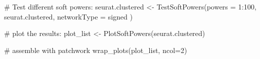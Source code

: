 \documentclass[
  letterpaper,
  DIV=11,
  numbers=noendperiod]{scrartcl}
\newenvironment{Shaded}{\begin{snugshade}}{\end{snugshade}}
\newcommand{\AttributeTok}[1]{\textcolor[rgb]{0.40,0.45,0.13}{#1}}
\newcommand{\CommentTok}[1]{\textcolor[rgb]{0.37,0.37,0.37}{#1}}
\newcommand{\DecValTok}[1]{\textcolor[rgb]{0.68,0.00,0.00}{#1}}
\newcommand{\FunctionTok}[1]{\textcolor[rgb]{0.28,0.35,0.67}{#1}}
\newcommand{\NormalTok}[1]{\textcolor[rgb]{0.00,0.23,0.31}{#1}}
\newcommand{\OtherTok}[1]{\textcolor[rgb]{0.00,0.23,0.31}{#1}}
\newcommand{\SpecialCharTok}[1]{\textcolor[rgb]{0.37,0.37,0.37}{#1}}
\newcommand{\StringTok}[1]{\textcolor[rgb]{0.13,0.47,0.30}{#1}}
\begin{document}
\begin{Shaded}
\begin{Highlighting}[]
\CommentTok{\# Test different soft powers:}
\NormalTok{seurat.clustered }\OtherTok{\textless{}{-}} \FunctionTok{TestSoftPowers}\NormalTok{(}\AttributeTok{powers =} \DecValTok{1}\SpecialCharTok{:}\DecValTok{100}\NormalTok{,}
\NormalTok{  seurat.clustered,}
  \AttributeTok{networkType =} \StringTok{\textquotesingle{}signed\textquotesingle{}}
\NormalTok{)}

\CommentTok{\# plot the results:}
\NormalTok{plot\_list }\OtherTok{\textless{}{-}} \FunctionTok{PlotSoftPowers}\NormalTok{(seurat.clustered)}

\CommentTok{\# assemble with patchwork}
\FunctionTok{wrap\_plots}\NormalTok{(plot\_list, }\AttributeTok{ncol=}\DecValTok{2}\NormalTok{)}
\end{Highlighting}
\end{Shaded}
\end{document}
